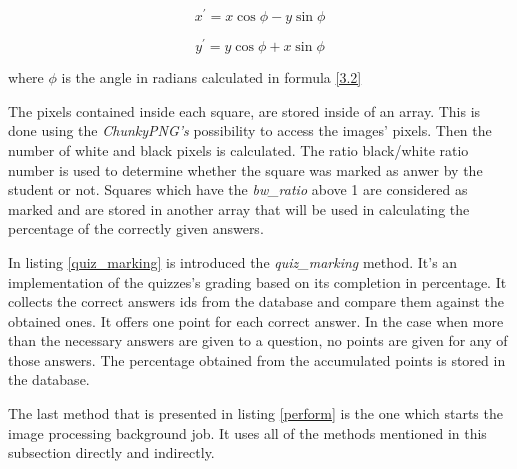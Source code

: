\begin{equation}
x^{\prime} = x \cos \phi - y \sin \phi \label{3.4}
\end{equation}

\begin{equation}
y^{\prime} = y \cos \phi + x \sin \phi \label{3.5}
\end{equation}

where $\phi$ is the angle in radians calculated in formula \ref{3.2}

The pixels contained inside each square, are stored inside of an array. This is done using the \textit{ChunkyPNG's} possibility to access the images' pixels. Then the number of white and black pixels is calculated. The ratio black/white ratio number is used to determine whether the square was marked as anwer by the student or not. Squares which have the \textit{bw\_ratio} above 1 are considered as marked and are stored in another array that will be used in calculating the percentage of the correctly given answers.



In listing \ref{quiz_marking} is introduced the \textit{quiz\_marking} method. It's an implementation of the quizzes's grading based on its completion in percentage. It collects the correct answers ids from the database and compare them against the obtained ones. It offers one point for each correct answer. In the case when more than the necessary answers are given to a question, no points are given for any of those answers. The percentage obtained from the accumulated points is stored in the database.





The last method that is presented in listing \ref{perform} is the one which starts the image processing background job. It uses all of the methods mentioned in this subsection directly and indirectly.




\clearpage